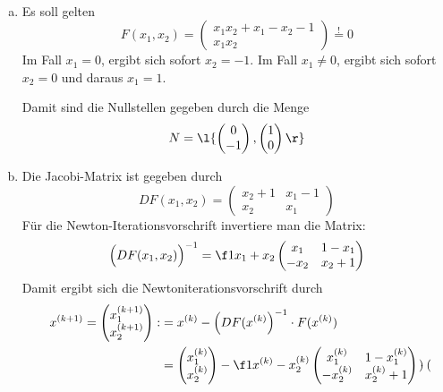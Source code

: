 \documentclass{mywork}
\begin{document}
\begin{aufgabe}~

	\begin{enumerate}[a)]
		\item
			Es soll gelten
			\[
				F(x_1,x_2) = \begin{pmatrix}
					x_1x_2 + x_1 - x_2 - 1 \\ x_1x_2
				\end{pmatrix}
				\stackrel != 0
			\]
			Im Fall $x_1 = 0$, ergibt sich sofort $x_2 = -1$.
			Im Fall $x_1 \neq 0$, ergibt sich sofort $x_2 = 0$ und daraus $x_1 = 1$.

			Damit sind die Nullstellen gegeben durch die Menge
			\[
				N = \l\{ \begin{pmatrix}
					0 \\ -1 
				\end{pmatrix}, \begin{pmatrix}
					1 \\ 0
				\end{pmatrix} \r\}
			\]
		\item
			Die Jacobi-Matrix ist gegeben durch
			\[
				DF(x_1,x_2) = \begin{pmatrix}
					x_2 + 1 & x_1 - 1 \\
					x_2 & x_1
				\end{pmatrix}
			\]
			Für die Newton-Iterationsvorschrift invertiere man die Matrix:
			\[
				\Big(DF(x_1,x_2)\Big)^{-1} = \f 1{x_1+x_2} \begin{pmatrix}
					x_1 & 1-x_1 \\
					-x_2 & x_2+1
				\end{pmatrix}
			\]
			Damit ergibt sich die Newtoniterationsvorschrift durch
			\begin{align*}
				x^{(k+1)} = \begin{pmatrix}
					x_1^{(k+1)} \\ x_2^{(k+1)}
				\end{pmatrix} :&= x^{(k)} - \Big(DF(x^{(k)}\Big)^{-1}\cdot F(x^{(k)}) \\ 
				&= \begin{pmatrix}
					x_1^{(k)} \\ x_2^{(k)}
				\end{pmatrix} - \f 1{x^{(k)}-x_2^{(k)}} \begin{pmatrix}
					x_1^{(k)} & 1 - x_1^{(k)} \\
					-x_2^{(k)} & x_2^{(k)} + 1
				\end{pmatrix} \cdot \begin{pmatrix}

\end{pmatrix}
\end{align*}
\end{enumerate}
\end{aufgabe}
\end{document}
